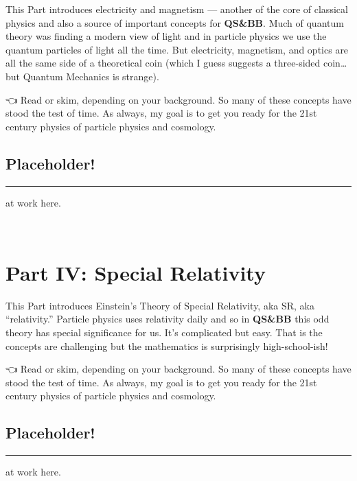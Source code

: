 \documentclass[
  letterpaper,
  DIV=11,
  numbers=noendperiod,
  oneside]{scrreprt}
\begin{document}
This Part introduces electricity and magnetism --- another of the core
of classical physics and also a source of important concepts for
\textbf{QS\&BB}. Much of quantum theory was finding a modern view of
light and in particle physics we use the quantum particles of light all
the time. But electricity, magnetism, and optics are all the same side
of a theoretical coin (which I guess suggests a three-sided
coin\ldots but Quantum Mechanics is strange).

👈 Read or skim, depending on your background. So many of these concepts
have stood the test of time. As always, my goal is to get you ready for
the 21st century physics of particle physics and cosmology.

\chapter{Placeholder!}\label{placeholder-1}

\begin{center}\rule{0.5\linewidth}{0.5pt}\end{center}

at work here.

😵‍💫

\part{Part IV: Special Relativity}

This Part introduces Einstein's Theory of Special Relativity, aka SR,
aka ``relativity.'' Particle physics uses relativity daily and so in
\textbf{QS\&BB} this odd theory has special significance for us. It's
complicated but easy. That is the concepts are challenging but the
mathematics is surprisingly high-school-ish!

👈 Read or skim, depending on your background. So many of these concepts
have stood the test of time. As always, my goal is to get you ready for
the 21st century physics of particle physics and cosmology.

\chapter{Placeholder!}\label{placeholder-2}

\begin{center}\rule{0.5\linewidth}{0.5pt}\end{center}

at work here.

😵‍💫
\end{document}
